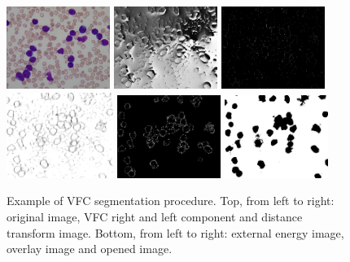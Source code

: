 \documentclass[final,a4paper,12pt,english]{UnicaPhdThesis3}
\begin{document}
	\begin{figure}[!t]
		\centering
		\includegraphics[height=0.2\textwidth, width=0.3\textwidth]{images/2018_1_visapp/015_1}
		\includegraphics[height=0.2\textwidth, width=0.3\textwidth]{images/2018_1_visapp/figure2}
		\includegraphics[height=0.2\textwidth, width=0.3\textwidth]{images/2018_1_visapp/figure3}
		\includegraphics[height=0.2\textwidth, width=0.31\textwidth]{images/2018_1_visapp/figure4}
		\includegraphics[height=0.2\textwidth, width=0.3\textwidth]{images/2018_1_visapp/figure5}
		\includegraphics[height=0.2\textwidth, width=0.3\textwidth]{images/2018_1_visapp/figure7}
		\caption{\label{fig:vfc1}Example of VFC segmentation procedure. Top, from left to right: original image, VFC right and left component and distance transform image. Bottom, from left to right: external energy image, overlay image and opened image.}
	\end{figure}
	
\end{document}
